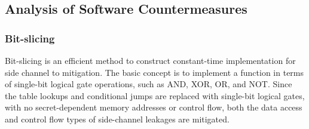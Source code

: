 \subsection{Analysis of Software Countermeasures}\label{sec:eval_countermeasures}
\subsubsection{Bit-slicing}

Bit-slicing is an efficient method to construct constant-time implementation for
side channel to mitigation. The basic concept is to
implement a function in terms of single-bit logical gate operations, such as AND, XOR, OR,
and NOT\@. 
   Since
the table lookups and conditional jumps are replaced with
single-bit logical gates, with no secret-dependent memory addresses or control flow,
 both the data access and control flow types of side-channel
leakages are mitigated.

